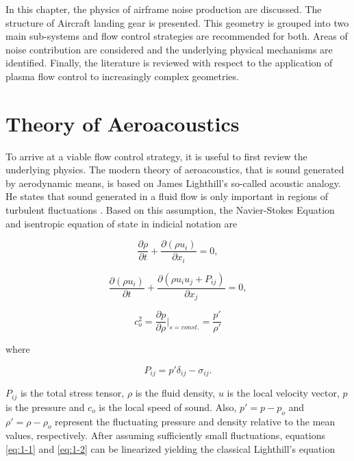 In this chapter, the physics of airframe noise production are discussed. The structure of Aircraft landing gear is presented. This geometry is grouped into two main sub-systems and flow control strategies are recommended for both. Areas of noise contribution are considered and the underlying physical mechanisms are identified. Finally, the literature is reviewed with respect to the application of plasma flow control to increasingly complex geometries.

\section{Theory of Aeroacoustics}
To arrive at a viable flow control strategy, it is useful to first review the underlying physics.
The modern theory of aeroacoustics, that is sound generated by aerodynamic means, is based on James Lighthill's so-called acoustic analogy. He states that sound generated in a fluid flow is only important in regions of turbulent fluctuations \cite{howe2003}. Based on this assumption, the Navier-Stokes Equation and isentropic equation of state in indicial notation are

\begin{equation} \label{eq:1-1}
	\frac{\partial \rho}{\partial t} + \frac{\partial(\rho u_i)}{\partial x_i} = 0,
\end{equation}

\begin{equation} \label{eq:1-2}
\frac{\partial (\rho u_i)}{\partial t} + \frac{\partial(\rho u_i u_j + P_{ij})}{\partial x_j} = 0,
\end{equation}

\begin{equation} \label{eq:1-3}
	c_o^2 = \frac{\partial p}{\partial \rho}|_{s=const.} = \frac{p'}{\rho'}
\end{equation}

where 

\begin{equation} \label{eq:pij}
P_{ij} = p' \delta_{ij} - \sigma_{ij}.
\end{equation}

$P_{ij}$ is the total stress tensor, $\rho$ is the fluid density, $u$ is  the local velocity vector, $p$ is the pressure and $c_o$ is the local speed of sound. Also, $p' = p - p_o$ and $\rho' = \rho - \rho_o$ represent the fluctuating pressure and density relative to the mean values, respectively. After assuming sufficiently small fluctuations, equations \ref{eq:1-1} and \ref{eq:1-2} can be linearized yielding the classical Lighthill's equation

